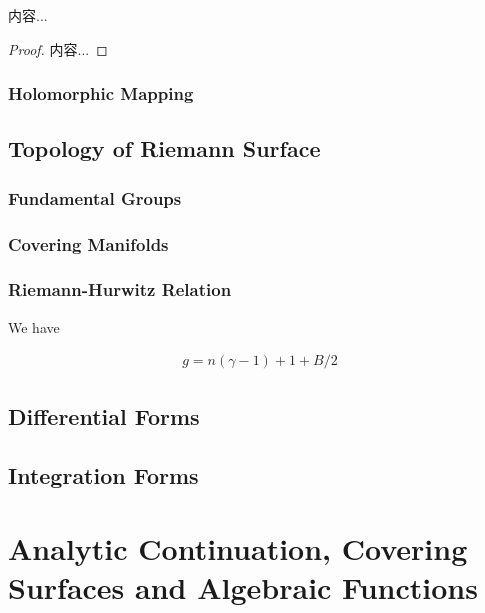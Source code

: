 \documentclass[Total.tex]{subfiles}
\begin{document}
			\begin{lemma}
				内容...
			\end{lemma}
			
			\begin{proof}
				内容...
			\end{proof}
			
			
			\subsection{Holomorphic Mapping}
			
		\section{Topology of Riemann Surface}
			\subsection{Fundamental Groups}
			
			\subsection{Covering Manifolds}
			
			\subsection{Riemann-Hurwitz Relation}
			
				\begin{theorem}
					We have
					
					\begin{gather*}
						g=n(\gamma-1)+1+B/2
					\end{gather*}
				\end{theorem}
		
		\section{Differential Forms}
		
		\section{Integration Forms}
	\chapter{Analytic Continuation, Covering Surfaces and Algebraic Functions}
\end{document}
